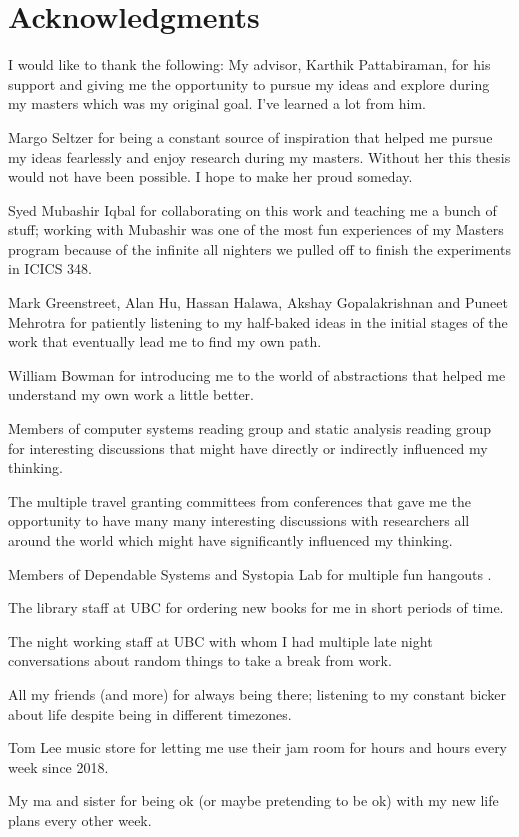 
\chapter{Acknowledgments}

I would like to thank the following:
My advisor, Karthik Pattabiraman, for his support and giving me the opportunity to pursue my ideas and explore during my masters which was my original goal. I've learned a lot from him. 

Margo Seltzer for being a constant source of inspiration that helped me pursue my ideas fearlessly and enjoy research during my masters. Without her this thesis would not have been possible. I hope to make her proud someday. 

Syed Mubashir Iqbal for collaborating on this work and teaching me a bunch of stuff; working with Mubashir was one of the most fun experiences of my Masters program because of the infinite all nighters we pulled off to finish the experiments in ICICS 348. 

Mark Greenstreet, Alan Hu, Hassan Halawa, Akshay Gopalakrishnan and Puneet Mehrotra for patiently listening to my half-baked ideas in the initial stages of the work that eventually lead me to find my own path. 

William Bowman for introducing me to the world of abstractions that helped me understand my own work a little better.  

Members of computer systems reading group and static analysis reading group for interesting discussions that might have directly or indirectly influenced my thinking. 

The multiple travel granting committees from conferences that gave me the opportunity to have many many interesting discussions with researchers all around the world which might have significantly influenced my thinking. 

Members of Dependable Systems and Systopia Lab for multiple fun hangouts . 

The library staff at UBC for ordering new books for me in short periods of time. 

The night working staff at UBC with whom I had multiple late night conversations about random things to take a break from work. 


All my friends (and more) for always being there; listening to my constant bicker about life despite being in different timezones. 

Tom Lee music store for letting me use their jam room for hours and hours every week since 2018. 

My ma and sister for being ok (or maybe pretending to be ok) with my new life plans every other week.    




